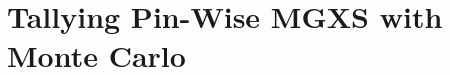 \documentclass[12pt,twoside]{mitthesis-exec}
\begin{document}
%
%

\section*{Tallying Pin-Wise MGXS with Monte Carlo}
\end{document}
